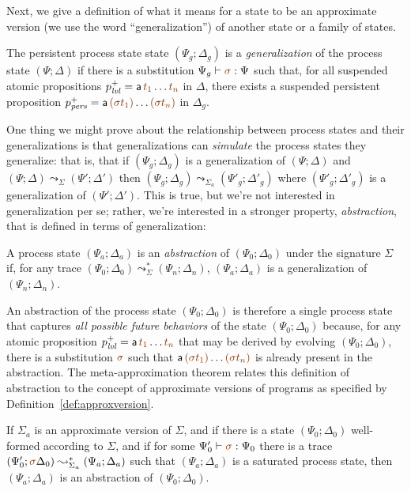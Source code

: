 Next, we give a definition of what it means for a state to be an 
approximate version (we use the word ``generalization'') of another state
or a family of states. 

\bigskip
\begin{definition}
  The persistent process state state $(\Psi_g; \Delta_g)$ is a {\em
    generalization} of the process state $(\Psi; \Delta)$ if there is
  a substitution $\Psi_g \vdash \lf{\sigma} : \Psi$ such that, for all
  suspended atomic propositions $p^+_\mlvl = {\sf a}\,\lf{t_1}\ldots \lf{t_n}$
  in $\Delta$, there exists a suspended persistent proposition
  $p^+_\mpers = {\sf a}\,\lf{(\sigma t_1)}\ldots\lf{(\sigma t_n)}$ in
  $\Delta_g$.
\end{definition}
\bigskip

One thing we might prove about the relationship between process states
and their generalizations is that generalizations can {\it simulate}
the process states they generalize: that is, that if $(\Psi_g;
\Delta_g)$ is a generalization of $(\Psi; \Delta)$ and $(\Psi; \Delta)
\leadsto_\Sigma (\Psi'; \Delta')$ then $(\Psi_g; \Delta_g)
\leadsto_{\Sigma_a} (\Psi'_g; \Delta'_g)$ where $(\Psi'_g; \Delta'_g)$
is a generalization of $(\Psi'; \Delta')$. This is true, but we're not
interested in generalization per se; rather, we're interested in a
stronger property, {\em abstraction}, that is defined in terms of
generalization:

\bigskip
\begin{definition}
A process state $(\Psi_a; \Delta_a)$ is an {\em abstraction} of 
$(\Psi_0; \Delta_0)$ under the signature $\Sigma$ if, for any trace
$(\Psi_0; \Delta_0) \leadsto^*_\Sigma (\Psi_n; \Delta_n)$, 
$(\Psi_a; \Delta_a)$ is a generalization of $(\Psi_n; \Delta_n)$. 
\end{definition}
\bigskip

An abstraction of the process state $(\Psi_0; \Delta_0)$ is therefore
a single process state that captures {\it all possible future
  behaviors} of the state $(\Psi_0; \Delta_0)$ because, for any atomic
proposition $p^+_\mlvl = {\sf a}\,\lf{t_1}\ldots \lf{t_n}$ that may be derived
by evolving $(\Psi_0; \Delta_0)$, there is a substitution $\lf\sigma$
such that ${\sf a}\,\lf{(\sigma t_1)}\ldots\lf{(\sigma t_n)}$ is already present
in the abstraction. The meta-approximation theorem relates this definition
of abstraction to the concept of approximate versions of programs as
specified by Definition~\ref{def:approxversion}.  

\bigskip
\begin{theorem}\label{thm:metapprox}
  If $\Sigma_a$ is an approximate version of $\Sigma$, and if there is a
  state $(\Psi_0; \Delta_0)$ well-formed according to $\Sigma$, and if
  for some $\Psi_0' \vdash \lf\sigma : \Psi_0$ there is a trace
  $(\Psi_0'; \lf\sigma\Delta_0) \leadsto^*_{\Sigma_a} (\Psi_a; \Delta_a)$
  such that $(\Psi_a; \Delta_a)$ is a saturated process state, then
  $(\Psi_a; \Delta_a)$ is an abstraction of $(\Psi_0; \Delta_0)$.
\end{theorem}


